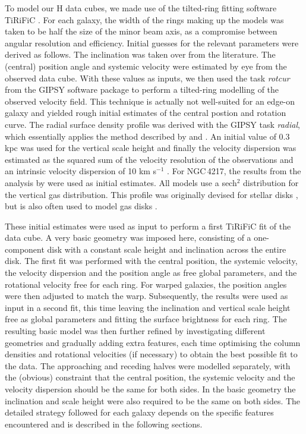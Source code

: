 \documentclass{aa}
\begin{document}
To model our H{} data cubes, we made use of the tilted-ring fitting software TiRiFiC \citep{jozsa07}. For each galaxy, the width of the rings making up the models was taken to be half the size of the minor beam axis, as a compromise between angular resolution and efficiency. Initial guesses for the relevant parameters were derived as follows. The inclination was taken over from the literature. The (central) position angle and systemic velocity were estimated by eye from the observed data cube. With these values as inputs, we then used the task {\it rotcur} from the GIPSY software package \citep{vanderhulst92} to perform a tilted-ring modelling of the observed velocity field. This technique is actually not well-suited for an edge-on galaxy and yielded rough initial estimates of the central postion and rotation curve. The radial surface density profile was derived with the GIPSY task {\it radial}, which essentially applies the method described by \cite{warmels88} and \cite{lucy74}. An initial value of 0.3 kpc was used for the vertical scale height and finally the velocity dispersion was estimated as the squared sum of the velocity resolution of the observations and an intrinsic velocity dispersion of 10 km s$^{-1}$ \citep{leroy08}. For NGC\,4217, the results from the analysis by \cite{verheijen01} were used as initial estimates. All models use a sech$^2$ distribution for the vertical gas distribution. This profile was originally devised for stellar disks \citep{spitzer42}, but is also often used to model gas disks \citep[see e.g.][]{moster10,gentile13}.
\par
These initial estimates were used as input to perform a first TiRiFiC fit of the data cube. A very basic geometry was imposed here, consisting of a one-component disk with a constant scale height and inclination across the entire disk. The first fit was performed with the central position, the systemic velocity, the velocity dispersion and the position angle as free global parameters, and the rotational velocity free for each ring. For warped galaxies, the position angles were then adjusted to match the warp. Subsequently, the results were used as input in a second fit, this time leaving the inclination and vertical scale height free as global parameters and fitting the surface brightness for each ring. The resulting basic model was then further refined by investigating different geometries and gradually adding extra features, each time optimising the column densities and rotational velocities (if necessary) to obtain the best possible fit to the data. The approaching and receding halves were modelled separately, with the (obvious) constraint that the central position, the systemic velocity and the velocity dispersion should be the same for both sides. In the basic geometry the inclination and scale height were also required to be the same on both sides. The detailed strategy followed for each galaxy depends on the specific features encountered and is described in the following sections.
\end{document}
